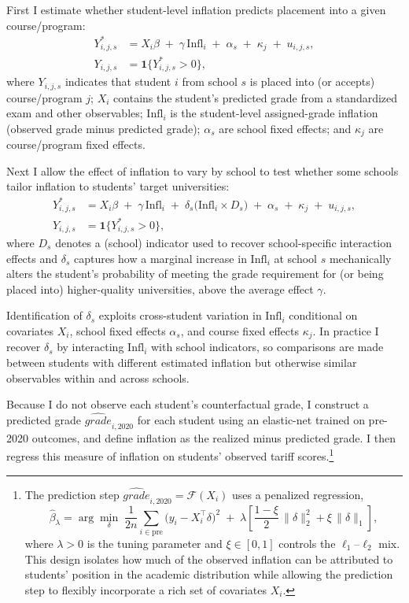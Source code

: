 First I estimate whether student-level inflation predicts placement into a given course/program:
\begin{align}
\label{eq:placement1}
Y^{*}_{i,j,s} &= X_{i}\beta \;+\; \gamma\,\mathrm{Infl}_{i}\;+\; \alpha_s \;+\; \kappa_{j} \;+\; u_{i,j,s},\\
Y_{i,j,s} &= \mathbf{1}\{Y^{*}_{i,j,s} > 0\},
\end{align}
where \(Y_{i,j,s}\) indicates that student \(i\) from school \(s\) is placed into (or accepts) course/program \(j\); \(X_i\) contains the student's predicted grade from a standardized exam and other observables; \(\mathrm{Infl}_i\) is the student-level assigned-grade inflation (observed grade minus predicted grade); \(\alpha_s\) are school fixed effects; and \(\kappa_j\) are course/program fixed effects.

Next I allow the effect of inflation to vary by school to test whether some schools tailor inflation to students' target universities:
\begin{align}
\label{eq:placement2}
Y^{*}_{i,j,s} &= X_{i}\beta \;+\; \gamma\,\mathrm{Infl}_{i} \;+\; \delta_s\big(\mathrm{Infl}_{i}\times D_s\big) \;+\; \alpha_s \;+\; \kappa_{j} \;+\; u_{i,j,s},\\
Y_{i,j,s} &= \mathbf{1}\{Y^{*}_{i,j,s} > 0\},
\end{align}
where \(D_s\) denotes a (school) indicator used to recover school-specific interaction effects and \(\delta_s\) captures how a marginal increase in \(\mathrm{Infl}_i\) at school \(s\) mechanically alters the student's probability of meeting the grade requirement for (or being placed into) higher-quality universities, above the average effect \(\gamma\).

Identification of \(\delta_s\) exploits cross-student variation in \(\mathrm{Infl}_i\) conditional on covariates \(X_i\), school fixed effects \(\alpha_s\), and course fixed effects \(\kappa_j\). In practice I recover \(\delta_s\) by interacting \(\mathrm{Infl}_i\) with school indicators, so comparisons are made between students with different estimated inflation but otherwise similar observables within and across schools.

Because I do not observe each student's counterfactual grade, I construct a predicted grade \(\hat{grade}_{i,2020}\) for each student using an elastic-net trained on pre-2020 outcomes, and define inflation as the realized minus predicted grade. I then regress this measure of inflation on students' observed tariff scores.\footnote{The prediction step \(\hat{grade}_{i,2020} = \mathcal{F}(X_i)\) uses a penalized regression,
\[
\hat\beta_\lambda
=\arg\min_{\delta}\;
\frac{1}{2n}\sum_{i\in\text{pre}}
\big(y_i-X_i^\top\delta\big)^2
\;+\;
\lambda\!\left[
\frac{1-\xi}{2}\,\|\delta\|_2^2 + \xi\,\|\delta\|_1
\right],
\]
where \(\lambda>0\) is the tuning parameter and \(\xi\in[0,1]\) controls the \(\ell_1\)–\(\ell_2\) mix. This design isolates how much of the observed inflation can be attributed to students' position in the academic distribution while allowing the prediction step to flexibly incorporate a rich set of covariates \(X_i\).}

